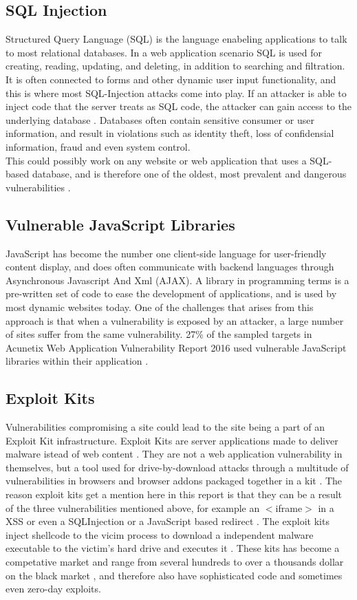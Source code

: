 \subsection{SQL Injection}
Structured Query Language (SQL) is the language enabeling applications to talk to most relational databases. In a web application scenario SQL is used for creating, reading, updating, and deleting, in addition to searching and filtration. It is often connected to forms and other dynamic user input functionality, and this is where most SQL-Injection attacks come into play. If an attacker is able to inject code that the server treats as SQL code, the attacker can gain access to the underlying database \cite{Bisson2005}. Databases often contain sensitive consumer or user information, and result in violations such as identity theft, loss of confidensial information, fraud and even system control.
\\ This could possibly work on any website or web application that uses a SQL-based database, and is therefore one of the oldest, most prevalent and dangerous vulnerabilities \cite{Acunetix2016}.
\subsection{Vulnerable JavaScript Libraries}
JavaScript has become the number one client-side language for user-friendly content display, and does often communicate with backend languages through Asynchronous Javascript And Xml (AJAX). A library in programming terms is a pre-written set of code to ease the development of applications, and is used by most dynamic websites today. One of the challenges that arises from this approach is that when a vulnerability is exposed by an attacker, a large number of sites suffer from the same vulnerability.
27\% of the sampled targets in Acunetix Web Application Vulnerability Report 2016 used vulnerable JavaScript libraries within their application \cite{Acunetix2016}. 
\subsection{Exploit Kits}
Vulnerabilities compromising a site could lead to the site being a part of an Exploit Kit infrastructure. Exploit Kits are server applications made to deliver malware istead of web content \cite{Preuss2011}. They are not a web application vulnerability in themselves, but a tool used for drive-by-download attacks through a multitude of vulnerabilities in browsers and browser addons packaged together in a kit \cite{Kotov2013}. The reason exploit kits get a mention here in this report is that they can be a result of the three vulnerabilities mentioned above, for example an $<$iframe$>$ in a XSS or even a SQLInjection or a JavaScript based redirect \cite{Preuss2011}.
The exploit kits inject shellcode to the vicim process to download a independent malware executable to the victim's hard drive and executes it \cite{Preuss2011}.
These kits has become a competative market and range from several hundreds to over a thousands dollar on the black market \cite{Preuss2011}, and therefore also have sophisticated code and sometimes even zero-day exploits.
